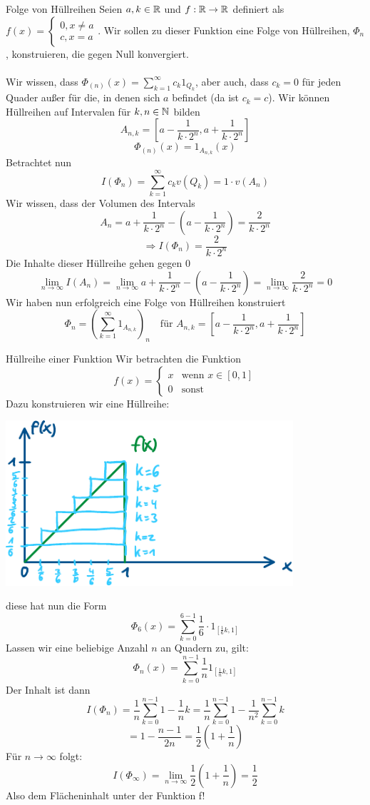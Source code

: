 \begin{Beispiel}{Folge von Hüllreihen}
Seien $a, k\in \mathbb{R}$ und $f:\mathbb{R}\rightarrow\mathbb{R}$ definiert als $f(x)=\begin{cases}0, x\neq a \\ c, x=a\end{cases}$. Wir sollen zu dieser Funktion eine Folge von Hüllreihen, $\Phi_n$, konstruieren, die gegen Null konvergiert. \\ \\
Wir wissen, dass $\Phi_{(n)}(x) = \sum_{k=1}^\infty c_k 1_{Q_k}$, aber auch, dass $c_k=0$ für jeden Quader außer für die, in denen sich $a$ befindet (da ist $c_k=c$). Wir können Hüllreihen auf Intervalen für $k,n\in \mathbb{N}$ bilden
$$A_{n,k}=[a-\frac{1}{k\cdot 2^n}, a+\frac{1}{k\cdot 2^n}]$$
$$\Phi_{(n)}(x)= 1_{A_{n,k}}(x)$$
Betrachtet nun 
$$I(\Phi_n)=\sum_{k=1}^\infty c_k v(Q_k) = 1\cdot v(A_n)$$
Wir wissen, dass der Volumen des Intervals $$A_n=a+\frac{1}{k\cdot 2^n}-(a-\frac{1}{k\cdot 2^n})=\frac{2}{k\cdot 2^n}$$
$$\Rightarrow I(\Phi_n)=\frac{2}{k\cdot 2^n}$$
Die Inhalte dieser Hüllreihe gehen gegen 0
$$\lim_{n\rightarrow\infty}I(A_n)=\lim_{n\rightarrow\infty} a+\frac{1}{k\cdot 2^n}-(a-\frac{1}{k\cdot 2^n})=\lim_{n\rightarrow\infty}\frac{2}{k\cdot 2^n}=0$$
Wir haben nun erfolgreich eine Folge von Hüllreihen konstruiert
$$\Phi_n=(\sum_{k=1}^\infty 1_{A_{n,k}})_n \quad \mbox{für $A_{n,k}=[a-\frac{1}{k\cdot 2^n}, a+\frac{1}{k\cdot 2^n}]$}$$
\end{Beispiel}
\begin{Beispiel}{Hüllreihe einer Funktion}
Wir betrachten die Funktion 
\begin{equation*}
  f(x)=\begin{cases}
    x & \mbox{wenn $x\in [0,1]$} \\
    0 & \mbox{sonst}
\end{cases}  
\end{equation*}
Dazu konstruieren wir eine Hüllreihe:
            \begin{center}
    \includegraphics[width=0.80\textwidth]{Dateien/Hullreihe.pdf}
\end{center}
diese hat nun die Form $$\Phi_6(x)=\sum_{k=0}^{6-1}\frac{1}{6}\cdot 1_{[\frac{1}{6}k, 1]}$$ Lassen wir eine beliebige Anzahl $n$ an Quadern zu, gilt:
$$\Phi_n(x)=\sum_{k=0}^{n-1}\frac{1}{n}1_{[\frac{1}{n}k, 1]}$$
Der Inhalt ist dann
$$I(\Phi_n)=\frac{1}{n}\sum_{k=0}^{n-1} 1 -\frac{1}{n}k=\frac{1}{n}\sum_{k=0}^{n-1} 1 - \frac{1}{n^2}\sum_{k=0}^{n-1} k$$
$$=1-\frac{n-1}{2n}=\frac{1}{2}(1+\frac{1}{n})$$
Für $n\rightarrow \infty$ folgt:
$$I(\Phi_\infty)=\lim_{n\rightarrow\infty} \frac{1}{2}(1+\frac{1}{n})=\frac{1}{2}$$
Also dem Flächeninhalt unter der Funktion f!
\end{Beispiel}
